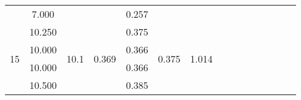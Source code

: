 \documentclass[a4paper,12pt]{article}
\begin{document}
\begin{table}[htp]
\begin{tabular}{|c|c|c|c|c|c|c|c|c|c|c|c|c|c|c|}
                       & 7.000                   &                                       &                        & 0.257 &                        &                        &                        &                               &                                                            &                                                            &                         &                         &                         &                             \\ \cline{1-7}
\multirow{5}{*}{15}    & 10.250                  & \multirow{5}{*}{10.1}                 & \multirow{5}{*}{0.369} & 0.375 & \multirow{5}{*}{0.375} & \multirow{5}{*}{1.014} &                        &                               &                                                            &                                                            &                         &                         &                         &                             \\ \cline{2-2} \cline{5-5}
                       & 10.000                  &                                       &                        & 0.366 &                        &                        &                        &                               &                                                            &                                                            &                         &                         &                         &                             \\ \cline{2-2} \cline{5-5}
                       & 10.000                  &                                       &                        & 0.366 &                        &                        &                        &                               &                                                            &                                                            &                         &                         &                         &                             \\ \cline{2-2} \cline{5-5}
                       & 10.500                  &                                       &                        & 0.385 &                        &                        &                        &                               &                                                            &                                                            &                         &                         &                         &                             \\ \cline{2-2} \cline{5-5}

\end{tabular}
\end{table}
\end{document}
